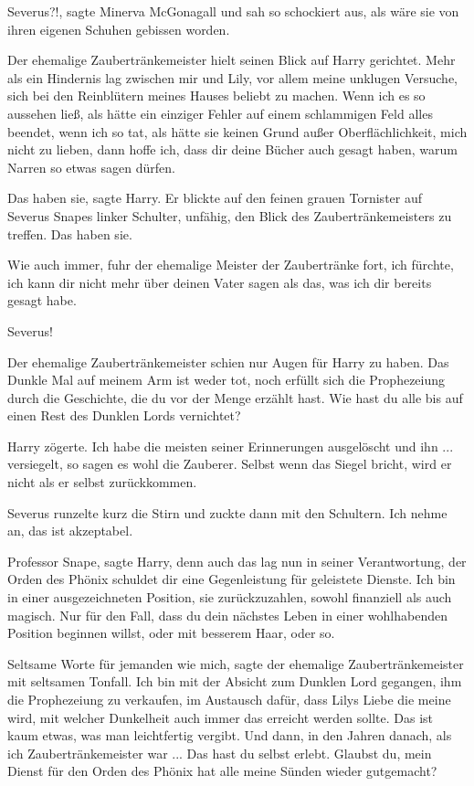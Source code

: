 \glqq{}Severus?!\grqq{}, sagte Minerva McGonagall und sah so schockiert aus, als
wäre sie von ihren eigenen Schuhen gebissen worden.

Der ehemalige Zaubertränkemeister hielt seinen Blick auf Harry gerichtet. \glqq{}
Mehr als ein Hindernis lag zwischen mir und Lily, vor allem meine unklugen
Versuche, sich bei den Reinblütern meines Hauses beliebt zu machen. Wenn ich es
so aussehen ließ, als hätte ein einziger Fehler auf einem schlammigen Feld alles
beendet, wenn ich so tat, als hätte sie keinen Grund außer Oberflächlichkeit,
mich nicht zu lieben, dann hoffe ich, dass dir deine Bücher auch gesagt haben,
warum Narren so etwas sagen dürfen.\grqq{}

\glqq{}Das haben sie\grqq{}, sagte Harry. Er blickte auf den feinen grauen
Tornister auf Severus Snapes linker Schulter, unfähig, den Blick des
Zaubertränkemeisters zu treffen. \glqq{}Das haben sie.\grqq{}

\glqq{}Wie auch immer\grqq{}, fuhr der ehemalige Meister der Zaubertränke fort,
\glqq{}ich fürchte, ich kann dir nicht mehr über deinen Vater sagen als das, was
ich dir bereits gesagt habe.\grqq{}

\glqq{}Severus!\grqq{}

Der ehemalige Zaubertränkemeister schien nur Augen für Harry zu haben. \glqq{}Das
Dunkle Mal auf meinem Arm ist weder tot, noch erfüllt sich die Prophezeiung
durch die Geschichte, die du vor der Menge erzählt hast. Wie hast du alle bis
auf einen Rest des Dunklen Lords vernichtet?\grqq{}

Harry zögerte. \glqq{}Ich habe die meisten seiner Erinnerungen ausgelöscht und
ihn ... versiegelt, so sagen es wohl die Zauberer. Selbst wenn das Siegel
bricht, wird er nicht als er selbst zurückkommen.\grqq{}

Severus runzelte kurz die Stirn und zuckte dann mit den Schultern. \glqq{}Ich
nehme an, das ist akzeptabel.\grqq{}

\glqq{}Professor Snape\grqq{}, sagte Harry, denn auch das lag nun in seiner
Verantwortung, \glqq{}der Orden des Phönix schuldet dir eine Gegenleistung für
geleistete Dienste. Ich bin in einer ausgezeichneten Position, sie
zurückzuzahlen, sowohl finanziell als auch magisch. Nur für den Fall, dass du
dein nächstes Leben in einer wohlhabenden Position beginnen willst, oder mit
besserem Haar, oder so.\grqq{}

\glqq{}Seltsame Worte für jemanden wie mich\grqq{}, sagte der ehemalige
Zaubertränkemeister mit seltsamen Tonfall. \glqq{}Ich bin mit der Absicht zum
Dunklen Lord gegangen, ihm die Prophezeiung zu verkaufen, im Austausch dafür,
dass Lilys Liebe die meine wird, mit welcher Dunkelheit auch immer das erreicht
werden sollte. Das ist kaum etwas, was man leichtfertig vergibt. Und dann, in
den Jahren danach, als ich Zaubertränkemeister war ... Das hast du selbst erlebt.
Glaubst du, mein Dienst für den Orden des Phönix hat alle meine Sünden wieder
gutgemacht?\grqq{}

